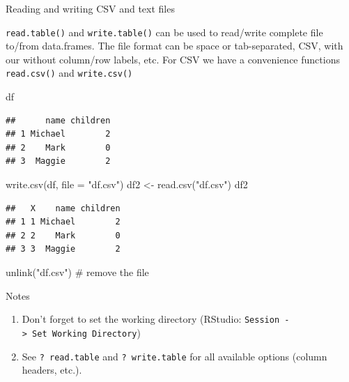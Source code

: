 \documentclass[
  9pt,
  ignorenonframetext,
]{beamer}
\newenvironment{Shaded}{\begin{snugshade}}{\end{snugshade}}
\newcommand{\CommentTok}[1]{\textcolor[rgb]{0.50,0.62,0.50}{#1}}
\newcommand{\DataTypeTok}[1]{\textcolor[rgb]{0.87,0.87,0.75}{#1}}
\newcommand{\KeywordTok}[1]{\textcolor[rgb]{0.94,0.87,0.69}{#1}}
\newcommand{\NormalTok}[1]{\textcolor[rgb]{0.80,0.80,0.80}{#1}}
\newcommand{\StringTok}[1]{\textcolor[rgb]{0.80,0.58,0.58}{#1}}
\providecommand{\tightlist}{%
  \setlength{\itemsep}{0pt}\setlength{\parskip}{0pt}}
\begin{document}
\begin{frame}[fragile]{Reading and writing CSV and text files}
\protect\hypertarget{reading-and-writing-csv-and-text-files}{}
\small

\texttt{read.table()} and \texttt{write.table()} can be used to
read/write complete file to/from data.frames. The file format can be
space or tab-separated, CSV, with our without column/row labels, etc.
For CSV we have a convenience functions \texttt{read.csv()} and
\texttt{write.csv()} \vfill

\begin{Shaded}
\begin{Highlighting}[]
\NormalTok{df}
\end{Highlighting}
\end{Shaded}

\begin{verbatim}
##      name children
## 1 Michael        2
## 2    Mark        0
## 3  Maggie        2
\end{verbatim}

\begin{Shaded}
\begin{Highlighting}[]
\KeywordTok{write.csv}\NormalTok{(df, }\DataTypeTok{file =} \StringTok{"df.csv"}\NormalTok{)}
\NormalTok{df2 \textless{}{-}}\StringTok{ }\KeywordTok{read.csv}\NormalTok{(}\StringTok{"df.csv"}\NormalTok{)}
\NormalTok{df2}
\end{Highlighting}
\end{Shaded}

\begin{verbatim}
##   X    name children
## 1 1 Michael        2
## 2 2    Mark        0
## 3 3  Maggie        2
\end{verbatim}

\begin{Shaded}
\begin{Highlighting}[]
\KeywordTok{unlink}\NormalTok{(}\StringTok{"df.csv"}\NormalTok{)    }\CommentTok{\# remove the file}
\end{Highlighting}
\end{Shaded}

\begin{block}{Notes}
\protect\hypertarget{notes}{}
\begin{enumerate}
\tightlist
\item
  Don't forget to set the working directory (RStudio:
  \texttt{Session\ -\textgreater{}\ Set\ Working\ Directory})
\item
  See \texttt{?\ read.table} and \texttt{?\ write.table} for all
  available options (column headers, etc.).
\end{enumerate}
\end{block}
\end{frame}
\end{document}
